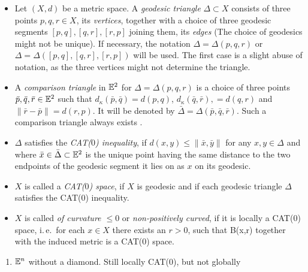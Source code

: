 
\begin{defin}
  \label{def:cat}
  \begin{itemize}
  \item Let \((X,d)\) be a metric space. A \emph{geodesic triangle} \(\Delta \subset X\) consists of three points \(p,q,r \in X\), its \emph{vertices}, together with a choice of three geodesic segments \([p,q], [q,r], [r, p]\) joining them, its \emph{edges} (The choice of geodesics might not be unique). If necessary, the notation \(\Delta = \Delta(p,q,r)\) or \(\Delta = \Delta([p,q], [q,r], [r,p])\) will be used. The first case is a slight abuse of notation, as the three vertices might not determine the triangle.
  \item A \emph{comparison triangle} in \(\mathbb{E}^2\) for \(\Delta = \Delta(p,q,r)\) is a choice of three points \(\bar p, \bar q, \bar r \in \mathbb{E}^2\) such that \(d_\kappa(\bar p, \bar q) = d(p, q)\), \(d_\kappa(\bar q, \bar r), = d(q, r)\) and \(\|\bar r- \bar p\| = d(r, p)\). It will be denoted by \(\bar \Delta = \Delta(\bar p, \bar q, \bar r)\). Such a comparison triangle always exists \cite[cf.][Sec.\ I.2]{MR1744486}.
  \item \(\Delta\) satisfies the \emph{CAT(\(0\)) inequality}, if \(d(x,y) \leq \|\bar x, \bar y\|\) for any \(x, y \in \Delta\) and where \(\bar x \in \bar \Delta \subset \mathbb{E}^2\) is the unique point having the same distance to the two endpoints of the geodesic segment it lies on as \(x\) on its geodesic.
  \item \(X\) is called a \emph{CAT(\(0\)) space}, if \(X\) is geodesic and if each geodesic triangle \(\Delta\) satisfies the CAT(\(0\)) inequality.
  \item \(X\) is called \emph{of curvature \(\leq 0\)} or \emph{non-positively curved}, if it is locally a CAT(\(0\)) space, i.\,e.\ for each \(x \in X\) there exists an \(r > 0\), such that B(x,r) together with the induced metric is a CAT(\(0\)) space.
  \end{itemize}
\end{defin}

\begin{bsp}
  \begin{enumerate}
  \item \(\mathbb{E}^n\) without a diamond. Still locally CAT(0), but not globally
  \end{enumerate}
\end{bsp}

